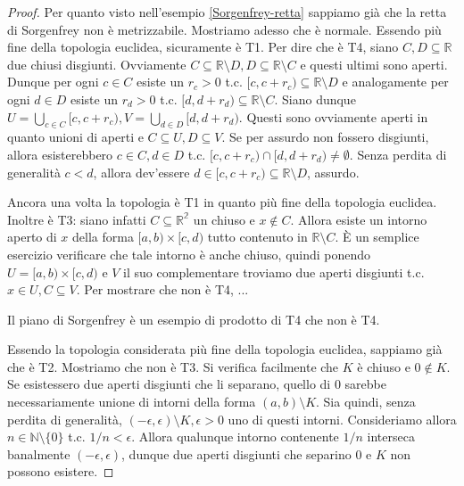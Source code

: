 \begin{proof}
  Per quanto visto nell'esempio \ref{Sorgenfrey-retta} sappiamo già che la retta di Sorgenfrey non è metrizzabile. Mostriamo adesso che è normale. Essendo più fine della topologia euclidea, sicuramente è T1. Per dire che è T4, siano $C, D \subseteq \mathbb{R}$ due chiusi disgiunti. Ovviamente $C \subseteq \mathbb{R} \setminus D, D \subseteq \mathbb{R} \setminus C$ e questi ultimi sono aperti. Dunque per ogni $c \in C$ esiste un  $r_c>0$ t.c. $[c, c+r_c) \subseteq \mathbb{R} \setminus D$ e analogamente per ogni
  $d \in D$ esiste un $r_d>0$ t.c. $[d, d+r_d) \subseteq \mathbb{R} \setminus C$. Siano dunque $\displaystyle U =\bigcup_{c \in C} [c, c+r_c), V=\bigcup_{d \in D} [d, d+r_d)$. Questi sono ovviamente aperti in quanto unioni di aperti e $C \subseteq U, D \subseteq V$. Se per assurdo non fossero disgiunti, allora esisterebbero $c \in C, d \in D$ t.c. $[c, c+r_c) \cap [d, d+r_d) \not= \emptyset$. Senza perdita di generalità $c<d$, allora dev'essere
  $d \in [c, c+r_c) \subseteq \mathbb{R} \setminus D$, assurdo.
  \item Ancora una volta la topologia è T1 in quanto più fine della topologia euclidea. Inoltre è T3: siano infatti $C \subseteq \mathbb{R^2}$ un chiuso e $x \not \in C$. Allora esiste un intorno aperto di $x$ della forma $[a, b) \times [c, d)$ tutto contenuto in $\mathbb{R} \setminus C$. È un semplice esercizio verificare che tale intorno è anche chiuso, quindi ponendo $U=[a, b) \times [c, d)$ e $V$ il suo complementare troviamo due aperti disgiunti t.c. $x \in U, C \subseteq V$.
  Per mostrare che non è T4, ... %
  \begin{oss}
    Il piano di Sorgenfrey è un esempio di prodotto di T4 che non è T4.
  \end{oss}
  \item Essendo la topologia considerata più fine della topologia euclidea, sappiamo già che è T2. Mostriamo che non è T3. Si verifica facilmente che $K$ è chiuso e $0 \not\in K$. Se esistessero due aperti disgiunti che li separano, quello di $0$ sarebbe necessariamente unione di intorni della forma $(a, b) \setminus K$. Sia quindi, senza perdita di generalità, $(-\epsilon, \epsilon) \setminus K, \epsilon>0$ uno di questi intorni. Consideriamo allora $n \in \mathbb{N} \setminus \{0\}$ t.c. $1/n < \epsilon$. Allora qualunque intorno contenente $1/n$ interseca banalmente $(-\epsilon, \epsilon)$, dunque due aperti disgiunti che separino $0$ e $K$ non possono esistere.
\end{proof}

